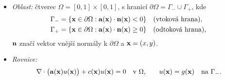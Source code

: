 \documentclass{sna}
\begin{document}
\begin{itemize}
  \item \textit{Oblast:} čtverec $\Omega = [0,1]\times [0,1]$, s hranicí $\partial\Omega = \Gamma_- \cup \Gamma_+$, kde
  $$
  \begin{aligned}
    \Gamma_- &= \{\mathbf{x}\in \partial\Omega: \mathbf{a}(\mathbf{x})\cdot\mathbf{n}(\mathbf{x}) < 0\}\quad \mbox{(vtoková hrana)},\\
    \Gamma_+ &= \{\mathbf{x}\in \partial\Omega: \mathbf{a}(\mathbf{x})\cdot\mathbf{n}(\mathbf{x}) \geq 0\}\quad \mbox{(odtoková hrana)},
  \end{aligned}
  $$
   $\mathbf{n}$ značí vektor vnější normály k $\partial\Omega$ a $\mathbf{x} = (x,y)$.
	\item \textit{Rovnice:} 
	\begin{equation}
	\label{eq:main}
    \nabla\cdot\bigl(\afield(\bx)u(\bx)\bigr) + c(\bx)u(\bx) = 0 \ \ \mbox{ v } \Omega \mbox{,}\qquad u(\bx) = g(\bx)\ \ \mbox{ na } \Gamma_-.
  \end{equation}
  

\end{itemize}
\end{document}
